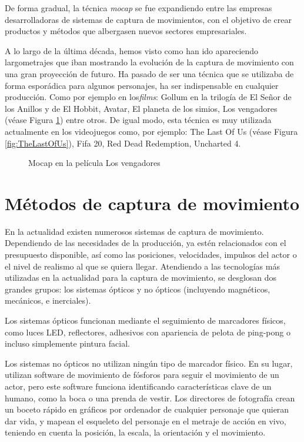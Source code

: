 De forma gradual, la técnica \textit{mocap} se fue expandiendo entre las empresas desarrolladoras de sistemas de captura de movimientos, con el objetivo de crear productos y métodos que albergasen nuevos sectores empresariales. 

A lo largo de la última década, hemos visto como han ido apareciendo largometrajes que iban mostrando la evolución de la captura de movimiento con una gran proyección de futuro. Ha pasado de ser una técnica que se utilizaba de forma esporádica para algunos personajes, ha ser indispensable en cualquier producción. Como por ejemplo en los\textit{films}: Gollum en la trilogía de El Señor de los Anillos y de El Hobbit, Avatar, El planeta de los simios, Los vengadores (véase Figura \ref{fig:Thanos}) entre otros. De igual modo, esta técnica es muy utilizada actualmente en los videojuegos como, por ejemplo: The Last Of Us (véase Figura \ref{fig:TheLastOfUs}), Fifa 20, Red Dead Redemption, Uncharted 4.

\begin{figure}[h!]
    \centering
    \caption{Mocap en la película Los vengadores}
    \label{fig:Thanos}  
\end{figure}

\section{Métodos de captura de movimiento}

En la actualidad existen numerosos sistemas de captura de movimiento. Dependiendo de las necesidades de la producción, ya estén relacionados con el presupuesto disponible, así como las posiciones, velocidades, impulsos del actor o el nivel de realismo al que se quiera llegar. Atendiendo a las tecnologías más utilizadas en la actualidad para la captura de movimiento, se desglosan dos grandes grupos: los sistemas ópticos y no ópticos (incluyendo magnéticos, mecánicos, e inerciales).

Los sistemas ópticos funcionan mediante el seguimiento de marcadores físicos, como luces LED, reflectores, adhesivos con apariencia de pelota de ping-pong o incluso simplemente pintura facial.

Los sistemas no ópticos no utilizan ningún tipo de marcador físico. En su lugar, utilizan software de movimiento de fósforos para seguir el movimiento de un actor, pero este software funciona identificando características clave de un humano, como la boca o una prenda de vestir. Los directores de fotografía crean un boceto rápido en gráficos por ordenador de cualquier personaje que quieran dar vida, y mapean el esqueleto del personaje en el metraje de acción en vivo, teniendo en cuenta la posición, la escala, la orientación y el movimiento.

